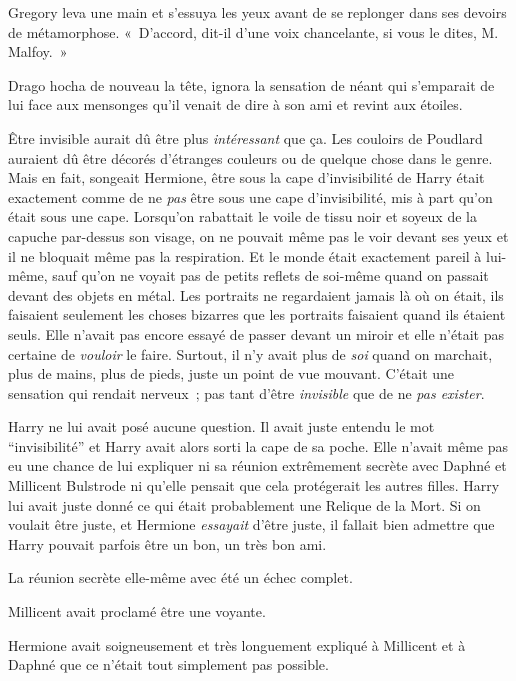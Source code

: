 Gregory leva une main et s'essuya les yeux avant de se replonger dans ses devoirs de métamorphose.
«~D'accord, dit-il d'une voix chancelante, si vous le dites, M. Malfoy.~»

Drago hocha de nouveau la tête, ignora la sensation de néant qui s'emparait de lui face aux mensonges qu'il venait de dire à son ami et revint aux étoiles.


Être invisible aurait dû être plus \emph{intéressant} que ça.
Les couloirs de Poudlard auraient dû être décorés d'étranges couleurs ou de quelque chose dans le genre.
Mais en fait, songeait Hermione, être sous la cape d'invisibilité de Harry était exactement comme de ne \emph{pas} être sous une cape d'invisibilité, mis à part qu'on était sous une cape.
Lorsqu'on rabattait le voile de tissu noir et soyeux de la capuche par-dessus son visage, on ne pouvait même pas le voir devant ses yeux et il ne bloquait même pas la respiration.
Et le monde était exactement pareil à lui-même, sauf qu'on ne voyait pas de petits reflets de soi-même quand on passait devant des objets en métal.
Les portraits ne regardaient jamais là où on était, ils faisaient seulement les choses bizarres que les portraits faisaient quand ils étaient seuls.
Elle n'avait pas encore essayé de passer devant un miroir et elle n'était pas certaine de \emph{vouloir} le faire.
Surtout, il n'y avait plus de \emph{soi} quand on marchait, plus de mains, plus de pieds, juste un point de vue mouvant.
C'était une sensation qui rendait nerveux~; pas tant d'être \emph{invisible} que de ne \emph{pas exister}.

Harry ne lui avait posé aucune question.
Il avait juste entendu le mot “invisibilité” et Harry avait alors sorti la cape de sa poche.
Elle n'avait même pas eu une chance de lui expliquer ni sa réunion extrêmement secrète avec Daphné et Millicent Bulstrode ni qu'elle pensait que cela protégerait les autres filles.
Harry lui avait juste donné ce qui était probablement une Relique de la Mort.
Si on voulait être juste, et Hermione \emph{essayait} d'être juste, il fallait bien admettre que Harry pouvait parfois être un bon, un très bon ami.

La réunion secrète elle-même avec été un échec complet.

Millicent avait proclamé être une voyante.

Hermione avait soigneusement et très longuement expliqué à Millicent et à Daphné que ce n'était tout simplement pas possible.


